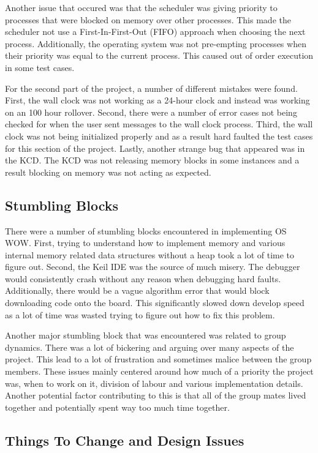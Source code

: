 \documentclass[se]{uw-wkrpt}
\begin{document}
Another issue that occured was that the scheduler was giving priority to processes that were blocked on memory over other processes. This made the scheduler not use a First-In-First-Out (FIFO) approach when choosing the next process. Additionally, the operating system was not pre-empting processes when their priority was equal to the current process. This caused out of order execution in some test cases.

For the second part of the project, a number of different mistakes were found. First, the wall clock was not working as a 24-hour clock and instead was working on an 100 hour rollover. Second, there were a number of error cases not being checked for when the user sent messages to the wall clock process. Third, the wall clock was not being initialized properly and as a result hard faulted the test cases for this section of the project. Lastly, another strange bug that appeared was in the KCD. The KCD was not releasing memory blocks in some instances and a result blocking on memory was not acting as expected.

\subsection{Stumbling Blocks}

There were a number of stumbling blocks encountered in implementing OS WOW. First, trying to understand how to implement memory and various internal memory related data structures without a heap took a lot of time to figure out. Second, the Keil IDE was the source of much misery. The debugger would consistently crash without any reason when debugging hard faults. Additionally, there would be a vague algorithm error that would block downloading code onto the board. This significantly slowed down develop speed as a lot of time was wasted trying to figure out how to fix this problem. 

Another major stumbling block that was encountered was related to group dynamics. There was a lot of bickering and arguing over many aspects of the project. This lead to a lot of frustration and sometimes malice between the group members. These issues mainly centered around how much of a priority the project was, when to work on it, division of labour and various implementation details. Another potential factor contributing to this is that all of the group mates lived together and potentially spent way too much time together.

\subsection{Things To Change and Design Issues}
\end{document}
